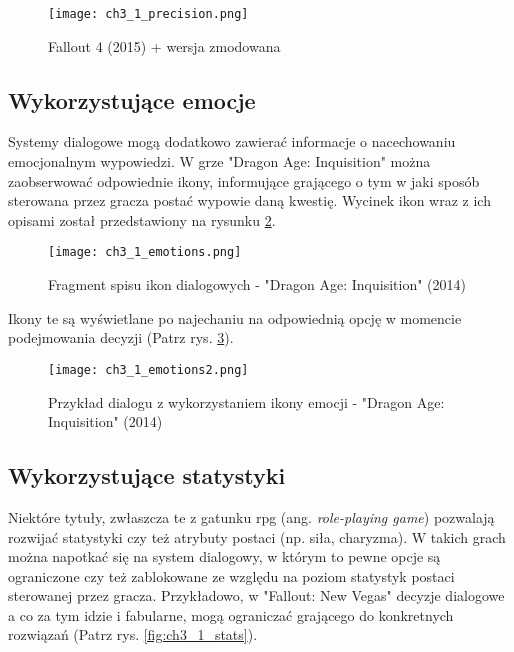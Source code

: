 \begin{figure}[h]
    \texttt{[image: ch3\_1\_precision.png]}
    \caption{Fallout 4 (2015) + wersja zmodowana\cite{spoken_conversational_ai}}
    \centering
    \label{fig:ch3_1_precision}
\end{figure}

\newpage

\subsection{Wykorzystujące emocje}

Systemy dialogowe mogą dodatkowo zawierać informacje o nacechowaniu emocjonalnym wypowiedzi.
W grze "Dragon Age: Inquisition" można zaobserwować odpowiednie ikony, informujące grającego o
tym w jaki sposób sterowana przez gracza postać wypowie daną kwestię. Wycinek ikon wraz z ich
opisami został przedstawiony na rysunku \ref{fig:ch3_1_emotions_list}.

\begin{figure}[h]
    \centering
    \texttt{[image: ch3\_1\_emotions.png]}
    \caption{Fragment spisu ikon dialogowych - "Dragon Age: Inquisition" (2014)\cite{dragon_age_fandom}}
    \label{fig:ch3_1_emotions_list}
\end{figure}

Ikony te są wyświetlane po najechaniu na odpowiednią opcję w momencie podejmowania decyzji
(Patrz rys. \ref{fig:ch3_1_emotions_example}).

\begin{figure}[h]
    \texttt{[image: ch3\_1\_emotions2.png]}
    \caption{Przykład dialogu z wykorzystaniem ikony emocji - "Dragon Age: Inquisition" (2014)}
    \centering
    \label{fig:ch3_1_emotions_example}
\end{figure}

\subsection{Wykorzystujące statystyki}

Niektóre tytuły, zwłaszcza te z gatunku \gls{rpg} (ang. \textit{role-playing game}) pozwalają rozwijać
statystyki czy też atrybuty postaci (np. siła, charyzma). W takich grach można napotkać się na
system dialogowy, w którym to pewne opcje są ograniczone czy też zablokowane ze względu na poziom
statystyk postaci sterowanej przez gracza. Przykładowo, w "Fallout: New Vegas" decyzje dialogowe
a co za tym idzie i fabularne, mogą ograniczać grającego do konkretnych rozwiązań
(Patrz rys. \ref{fig:ch3_1_stats}).

